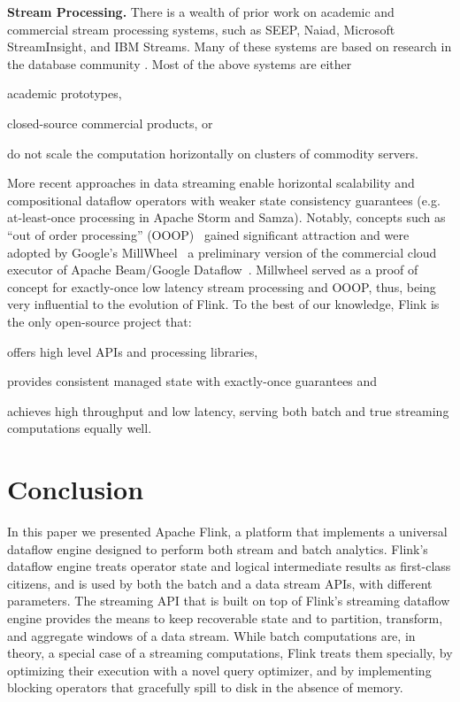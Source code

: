 \documentclass[11pt]{article}
\newcommand{\para}[1]{\vspace{2mm}\noindent\textbf{#1}}
\begin{document}
\para{Stream Processing.} There is a wealth of prior work on academic and commercial stream processing systems, such as SEEP, Naiad, Microsoft StreamInsight, and IBM Streams. Many of these systems are based on research in the database community \cite{chandrasekaran2003psoup,abadi2005design,arasu2004stream,chandramouli2014trill,gedik2008spade,migliavacca2010seep,murray2013naiad}. Most of the above systems are either
\begin{inparaenum}[i)]
  \item academic prototypes,
  \item closed-source commercial products, or 
  \item do not scale the computation horizontally on clusters of commodity servers.
\end{inparaenum}
More recent approaches in data streaming enable horizontal scalability and compositional dataflow operators with weaker state consistency guarantees (e.g. at-least-once processing in Apache Storm and Samza). Notably, concepts such as ``out of order processing'' (OOOP)~\cite{li2008out} gained significant attraction and were adopted by Google's MillWheel~\cite{akidau2013millwheel} a preliminary version of the commercial cloud executor of Apache Beam/Google Dataflow~\cite{akidau2015dataflow}. Millwheel served as a proof of concept for exactly-once low latency stream processing and OOOP, thus, being very influential to the evolution of Flink. To the best of our knowledge, Flink is the only open-source project that:
\begin{inparaenum}[i)]
  \item offers high level APIs and processing libraries,
  \item provides consistent managed state with exactly-once guarantees and
  \item achieves high throughput and low latency, serving both batch and true streaming computations equally well.
\end{inparaenum}

\vspace{-3mm}
\section{Conclusion}
\label{sec:conclusions}
In this paper we presented Apache Flink, a platform that implements a universal dataflow engine designed to perform both stream and batch analytics. Flink's dataflow engine treats operator state and logical intermediate results as first-class citizens, and is used by both the batch and a data stream APIs, with different parameters. The streaming API that is built on top of  Flink's streaming dataflow engine provides the means to keep recoverable state and to partition, transform, and aggregate windows of a data stream. While batch computations are, in theory, a special case of a streaming computations, Flink treats them specially, by optimizing their execution with a novel query optimizer, and by implementing blocking operators that gracefully spill to disk in the absence of memory. 

% 
% 
\printbibliography
\end{document}
